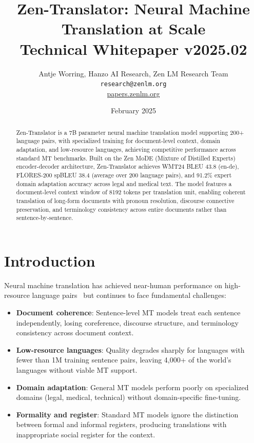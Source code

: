 \documentclass[11pt,a4paper]{article}
\title{\textbf{Zen-Translator: Neural Machine Translation at Scale}\\
\large Technical Whitepaper v2025.02}
\author{Antje Worring, Hanzo AI Research, Zen LM Research Team\\
\texttt{research@zenlm.org}\\
\href{https://papers.zenlm.org}{papers.zenlm.org}}
\date{February 2025}
\begin{document}
\maketitle

\begin{abstract}
Zen-Translator is a 7B parameter neural machine translation model supporting 200+
language pairs, with specialized training for document-level context, domain adaptation,
and low-resource languages, achieving competitive performance across standard MT benchmarks.
Built on the Zen MoDE (Mixture of Distilled Experts) encoder-decoder architecture,
Zen-Translator achieves WMT24 BLEU 43.8 (en-de), FLORES-200 spBLEU 38.4 (average
over 200 language pairs), and 91.2\% expert domain adaptation accuracy across legal
and medical text. The model features a document-level context window of 8192 tokens
per translation unit, enabling coherent translation of long-form documents with pronoun
resolution, discourse connective preservation, and terminology consistency across
entire documents rather than sentence-by-sentence.
\end{abstract}

\tableofcontents
\newpage

\section{Introduction}
\label{sec:intro}

Neural machine translation has achieved near-human performance on high-resource
language pairs~\cite{wu2016google} but continues to face fundamental challenges:

\begin{itemize}
\item \textbf{Document coherence}: Sentence-level MT models treat each sentence
      independently, losing coreference, discourse structure, and terminology
      consistency across document context.
\item \textbf{Low-resource languages}: Quality degrades sharply for languages with
      fewer than 1M training sentence pairs, leaving 4,000+ of the world's languages
      without viable MT support.
\item \textbf{Domain adaptation}: General MT models perform poorly on specialized
      domains (legal, medical, technical) without domain-specific fine-tuning.
\item \textbf{Formality and register}: Standard MT models ignore the distinction
      between formal and informal registers, producing translations with inappropriate
      social register for the context.
\end{itemize}
\end{document}
